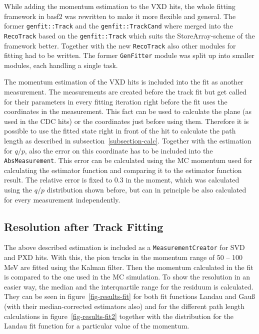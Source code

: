 While adding the momentum estimation to the VXD hits, the whole fitting framework in basf2 was rewritten to make it more flexible and general. The former \texttt{genfit::Track} and the \texttt{genfit::TrackCand} where merged into the \texttt{RecoTrack} based on the \texttt{genfit::Track} which suits the StoreArray-scheme of the framework better. Together with the new \texttt{RecoTrack} also other modules for fitting had to be written. The former \texttt{GenFitter} module was split up into smaller modules, each handling a single task. 

The momentum estimation of the VXD hits is included into the fit as another measurement. The measurements are created before the track fit but get called for their parameters in every fitting iteration right before the fit uses the coordinates in the measurement. This fact can be used to calculate the plane (as used in the CDC hits) or the coordinates just before using them. Therefore it is possible to use the fitted state right in front of the hit to calculate the path length as described in subsection~\ref{subsection-calc}. Together with the estimation for $q/p$, also the error on this coordinate has to be included into the \texttt{AbsMeasurement}. This error can be calculated using the MC momentum used for calculating the estimator function and comparing it to the estimator function result. The relative error is fixed to 0.3 in the moment, which was calculated using the $q/p$ distribution shown before, but can in principle be also calculated for every measurement independently.

\subsection{Resolution after Track Fitting}

The above described estimation is included as a \texttt{MeasurementCreator} for SVD and PXD hits. With this, the pion tracks in the momentum range of 50 -- 100 MeV are fitted using the Kalman filter. Then the momentum calculated in the fit is compared to the one used in the MC simulation. To show the resolution in an easier way, the median and the interquartile range for the residuum is calculated. They can be seen in figure~\ref{fig-results-fit} for both fit functions Landau and Gauß (with their median-corrected estimators also) and for the different path length calculations in figure~\ref{fig-results-fit2} together with the distribution for the Landau fit function for a particular value of the momentum.

